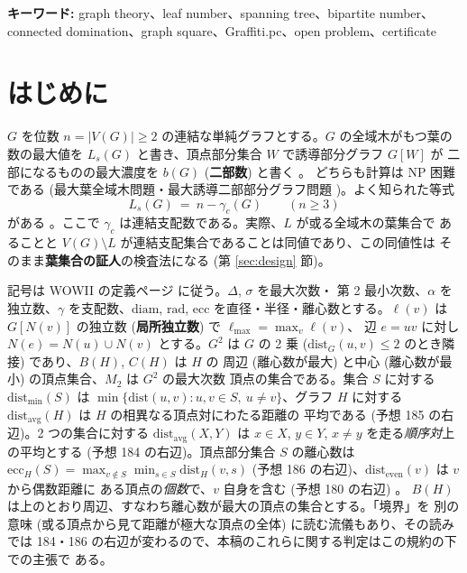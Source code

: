 \documentclass[paper=a4,fontsize=10.5pt,jafontsize=10.5pt]{jlreq}
\theoremstyle{plain}
\theoremstyle{definition}
\begin{document}
\noindent\textbf{キーワード:} graph theory、leaf number、spanning tree、bipartite number、connected domination、graph square、Graffiti.pc、open problem、certificate


\section{はじめに}

$G$ を位数 $n = |V(G)| \ge 2$ の連結な単純グラフとする。$G$ の全域木がもつ葉の
数の最大値を $L_s(G)$ と書き、頂点部分集合 $W$ で誘導部分グラフ $G[W]$ が
二部になるものの最大濃度を $b(G)$ (\textbf{二部数}) と書く \cite{wowii}。
どちらも計算は NP 困難である (最大葉全域木問題・最大誘導二部部分グラフ問題
\cite{gj1979})。よく知られた等式
\begin{equation}\label{eq:cds}
  L_s(G) \ = \ n - \gamma_c(G) \qquad (n \ge 3)
\end{equation}
がある \cite{sw1979}。ここで $\gamma_c$ は連結支配数である。実際、$L$ が或る全域木の葉集合で
あることと $V(G) \setminus L$ が連結支配集合であることは同値であり、この同値性は
そのまま\textbf{葉集合の証人}の検査法になる (第 \ref{sec:design} 節)。

記号は WOWII の定義ページ \cite{wowii} に従う。$\Delta$, $\sigma$ を最大次数・
第 2 最小次数、$\alpha$ を独立数、$\gamma$ を支配数、$\mathrm{diam}$,
$\mathrm{rad}$, $\mathrm{ecc}$ を直径・半径・離心数とする。$\ell(v)$ は
$G[N(v)]$ の独立数 (\textbf{局所独立数}) で $\ell_{\max} = \max_v \ell(v)$、
辺 $e = uv$ に対し $N(e) = N(u) \cup N(v)$ とする。$G^2$ は $G$ の 2 乗
($\mathrm{dist}_G(u,v) \le 2$ のとき隣接) であり、$B(H)$, $C(H)$ は $H$ の
周辺 (離心数が最大) と中心 (離心数が最小) の頂点集合、$M_2$ は $G^2$ の最大次数
頂点の集合である。集合 $S$ に対する $\mathrm{dist}_{\min}(S)$ は
$\min\{\mathrm{dist}(u,v) : u, v \in S,\ u \ne v\}$、グラフ $H$ に対する
$\mathrm{dist}_{\mathrm{avg}}(H)$ は $H$ の相異なる頂点対にわたる距離の
平均である (予想 185 の右辺)。2 つの集合に対する
$\mathrm{dist}_{\mathrm{avg}}(X, Y)$ は $x \in X$, $y \in Y$,
$x \ne y$ を走る\emph{順序対}上の平均とする (予想 184 の右辺)。頂点部分集合
$S$ の離心数は
$\mathrm{ecc}_H(S) = \max_{v \notin S} \min_{s \in S} \mathrm{dist}_H(v,s)$
(予想 186 の右辺)、$\mathrm{dist}_{\mathrm{even}}(v)$ は $v$ から偶数距離に
ある頂点の\emph{個数}で、$v$ 自身を含む (予想 180 の右辺) \cite{wowii}。
$B(H)$ は上のとおり周辺、すなわち離心数が最大の頂点の集合とする。「境界」を
別の意味 (或る頂点から見て距離が極大な頂点の全体) に読む流儀もあり、その読みでは
184・186 の右辺が変わるので、本稿のこれらに関する判定はこの規約の下での主張で
ある。
\end{document}
